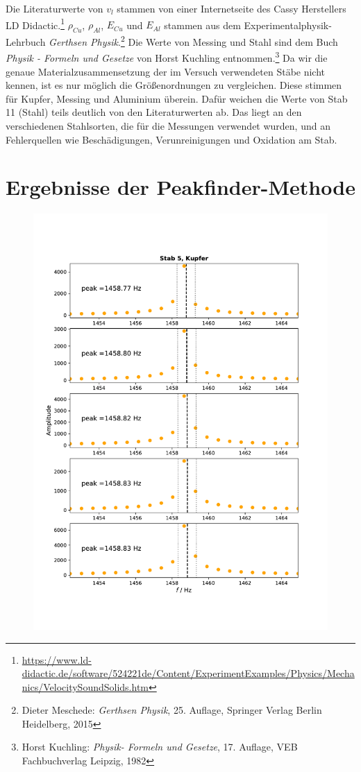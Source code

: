 \documentclass[a4paper, 12pt]{scrartcl}
\begin{document}
Die Literaturwerte von $v_l$ stammen von einer Internetseite des Cassy Herstellers LD Didactic.\footnote{\url{https://www.ld-didactic.de/software/524221de/Content/ExperimentExamples/Physics/Mechanics/VelocitySoundSolids.htm}} $\rho_{Cu}$, $\rho_{Al}$, $E_{Cu}$ und $E_{Al}$ stammen aus dem Experimentalphysik-Lehrbuch \textit{Gerthsen Physik}.\footnote{Dieter Meschede: \textit{Gerthsen Physik}, 25. Auflage, Springer Verlag Berlin Heidelberg, 2015} Die Werte von Messing und Stahl sind dem Buch \textit{Physik - Formeln und Gesetze} von Horst Kuchling entnommen.\footnote{Horst Kuchling: \textit{Physik- Formeln und Gesetze}, 17. Auflage, VEB Fachbuchverlag Leipzig, 1982}
Da wir die genaue Materialzusammensetzung der im Versuch verwendeten Stäbe nicht kennen, ist es nur möglich die Größenordnungen zu vergleichen. Diese stimmen für Kupfer, Messing und Aluminium überein. Dafür weichen die Werte von Stab 11 (Stahl) teils deutlich von den Literaturwerten ab. Das liegt an den verschiedenen Stahlsorten, die für die Messungen verwendet wurden, und an Fehlerquellen wie Beschädigungen, Verunreinigungen und Oxidation am Stab.

\newpage

\nopagebreak
\appendix
\section{Ergebnisse der Peakfinder-Methode}\label{anhang:plot}
\begin{figure}[H]
	\centering
	\includegraphics[width=\linewidth]{plots/anhang1.pdf}
\end{figure}
\end{document}
